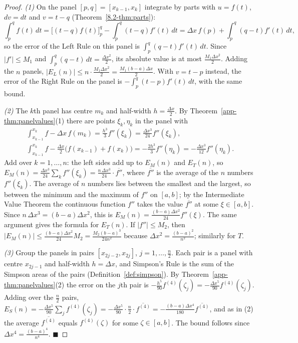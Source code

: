 \documentclass[11pt]{article}
\begin{document}
\begin{proof}
\emph{(1)} On the panel $[p,q]=[x_{k-1},x_k]$ integrate by parts with $u=f(t)$, $dv=dt$ and $v=t-q$ (Theorem~\ref{8.2-thm:parts}):
\[\int_p^qf(t)\,dt=\Big[(t-q)f(t)\Big]_p^q-\int_p^q(t-q)f'(t)\,dt=\Delta x\,f(p)+\int_p^q(q-t)f'(t)\,dt,\]
so the error of the Left Rule on this panel is $\int_p^q(q-t)f'(t)\,dt$. Since $\lvert f'\rvert\le M_1$ and $\int_p^q(q-t)\,dt=\frac{\Delta x^2}2$, its absolute value is at most $\frac{M_1\Delta x^2}2$. Adding the $n$ panels, $\lvert E_L(n)\rvert\le n\cdot\frac{M_1\Delta x^2}2=\frac{M_1(b-a)\Delta x}2$. With $v=t-p$ instead, the error of the Right Rule on the panel is $-\int_p^q(t-p)f'(t)\,dt$, with the same bound.

\emph{(2)} The $k$th panel has centre $m_k$ and half-width $h=\frac{\Delta x}2$. By Theorem~\ref{app-thm:panelvalues}(1) there are points $\xi_k,\eta_k$ in the panel with
\[\begin{gathered}\int_{x_{k-1}}^{x_k}f-\Delta x\,f(m_k)=\frac{h^3}3f''(\xi_k)=\frac{\Delta x^3}{24}f''(\xi_k),\\\int_{x_{k-1}}^{x_k}f-\frac{\Delta x}2\big(f(x_{k-1})+f(x_k)\big)=-\frac{2h^3}3f''(\eta_k)=-\frac{\Delta x^3}{12}f''(\eta_k).\end{gathered}\]
Add over $k=1,\ldots,n$: the left sides add up to $E_M(n)$ and $E_T(n)$, so $E_M(n)=\frac{\Delta x^3}{24}\sum_kf''(\xi_k)=\frac{n\,\Delta x^3}{24}\cdot\overline{f''}$, where $\overline{f''}$ is the average of the $n$ numbers $f''(\xi_k)$. The average of $n$ numbers lies between the smallest and the largest, so between the minimum and the maximum of $f''$ on $[a,b]$; by the Intermediate Value Theorem the continuous function $f''$ takes the value $\overline{f''}$ at some $\xi\in[a,b]$. Since $n\,\Delta x^3=(b-a)\Delta x^2$, this is $E_M(n)=\frac{(b-a)\Delta x^2}{24}f''(\xi)$. The same argument gives the formula for $E_T(n)$. If $\lvert f''\rvert\le M_2$, then $\lvert E_M(n)\rvert\le\frac{(b-a)\Delta x^2}{24}M_2=\frac{M_2(b-a)^3}{24n^2}$ because $\Delta x^2=\frac{(b-a)^2}{n^2}$; similarly for $T$.

\emph{(3)} Group the panels in pairs $[x_{2j-2},x_{2j}]$, $j=1,\ldots,\frac n2$. Each pair is a panel with centre $x_{2j-1}$ and half-width $h=\Delta x$, and Simpson's Rule is the sum of the Simpson areas of the pairs (Definition~\ref{def:simpson}). By Theorem~\ref{app-thm:panelvalues}(2) the error on the $j$th pair is $-\frac{h^5}{90}f^{(4)}(\zeta_j)=-\frac{\Delta x^5}{90}f^{(4)}(\zeta_j)$. Adding over the $\frac n2$ pairs, $E_S(n)=-\frac{\Delta x^5}{90}\sum_jf^{(4)}(\zeta_j)=-\frac{\Delta x^5}{90}\cdot\frac n2\cdot\overline{f^{(4)}}=-\frac{(b-a)\Delta x^4}{180}\overline{f^{(4)}}$, and as in (2) the average $\overline{f^{(4)}}$ equals $f^{(4)}(\zeta)$ for some $\zeta\in[a,b]$. The bound follows since $\Delta x^4=\frac{(b-a)^4}{n^4}$. $\blacksquare$
\end{proof}
\end{document}

